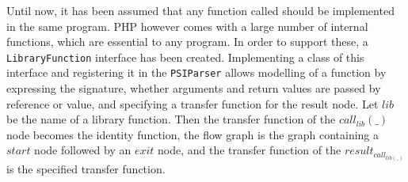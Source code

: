 Until now, it has been assumed that any function called should be implemented in the same program. PHP however comes with a large number of internal functions, which are essential to any program. In order to support these, a \texttt{LibraryFunction} interface has been created. Implementing a class of this interface and registering it in the \texttt{PSIParser} allows modelling of a function by expressing the signature, whether arguments and return values are passed by reference or value, and specifying a transfer function for the result node. Let $\mathit{lib}$ be the name of a library function. Then the transfer function of the $\mathit{call}_\mathit{lib}(\_)$ node becomes the identity function, the flow graph is the graph containing a $\mathit{start}$ node followed by an $\mathit{exit}$ node, and the transfer function of the $\mathit{result}_{\mathit{call}_{\mathit{lib}(\_)}}$ is the specified transfer function. 

